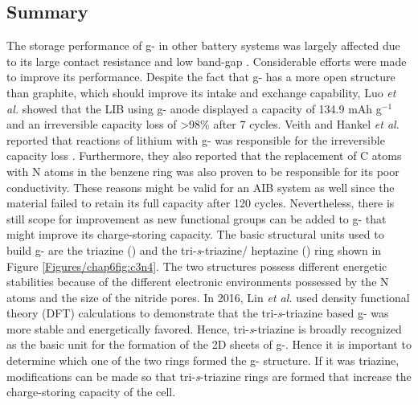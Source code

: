 \subsection{Summary}
The storage performance of g- in other battery systems was largely affected due to its large contact resistance and low band-gap \cite{shah_highly_2017}. Considerable efforts were made to improve its performance. Despite the fact that g- has a more open structure than graphite, which should improve its  intake and exchange capability, Luo \cite{luo_graphitic_2019} \textit{et al.} showed that the LIB using g- anode displayed a capacity of 134.9 mAh g$^{-1}$ and an irreversible capacity loss of >98\% after 7 cycles. Veith and Hankel \textit{et al.} reported that reactions of lithium with g- was responsible for the irreversible capacity loss \cite{veith_electrochemical_2013, hankel_lithium_2015}. Furthermore, they also reported that the replacement of C atoms with N atoms in the benzene ring was also proven to be responsible for its poor conductivity. These reasons might be valid for an AIB system as well since the material failed to retain its full capacity after 120 cycles. Nevertheless, there is still scope for improvement as new functional groups can be added to g- that might improve its charge-storing capacity. The basic structural units used to build g- are the triazine () and the tri-\textit{s}-triazine/ heptazine () ring shown in Figure \ref{Figures/chap6fig:c3n4}. The two structures possess different energetic stabilities because of the different electronic environments possessed by the N atoms and the size of the nitride pores. In 2016, Lin \textit{et al.} used density functional theory (DFT) calculations to demonstrate that the tri-\textit{s}-triazine based g- was more stable and energetically favored. Hence, tri-\textit{s}-triazine is broadly recognized as the basic unit for the formation of the 2D sheets of g-. Hence it is important to determine which one of the two rings formed the g- structure. If it was triazine, modifications can be made so that tri-\textit{s}-triazine rings are formed that increase the charge-storing capacity of the cell. 

